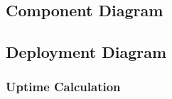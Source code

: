 \documentclass[11pt]{article}
\begin{document}
%

\subsection{Component Diagram}


\subsection{Deployment Diagram}


\subsubsection{Uptime Calculation}
\end{document}
